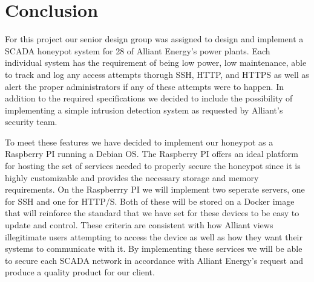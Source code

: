 \chapter{Conclusion}

For this project our senior design group was assigned to design and implement a SCADA honeypot system for 28 of Alliant Energy's power plants.  Each individual system has the requirement of being low power, low maintenance, able to track and log any access attempts thorugh SSH, HTTP, and HTTPS as well as alert the proper administrators if any of these attempts were to happen.  In addition to the required specifications we decided to include the possibility of implementing a simple intrusion detection system as requested by Alliant's security team.


To meet these features we have decided to implement our honeypot as a Raspberry PI running a Debian OS.  The Raspberry PI offers an ideal platform for hosting the set of services needed to properly secure the honeypot since it is highly customizable and provides the necessary storage and memory requirements.  On the Raspberrry PI we will implement two seperate servers, one  for SSH and one for HTTP/S.  Both of these will be stored on a Docker image that will reinforce the standard that we have set for these devices to be easy to update and control. These criteria are consistent with how Alliant views illegitimate users attempting to access the device as well as how they want their systems to communicate with it.  By implementing these services we will be able to secure each SCADA network in accordance with Alliant Energy's request and produce a quality product for our client.
